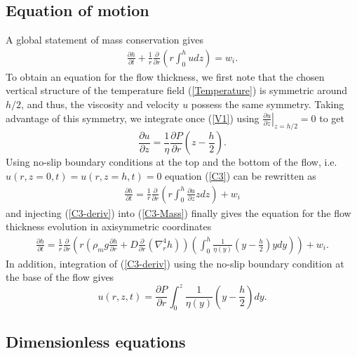 \subsection{Equation of motion}
\label{sec:equation-motion}

A global statement of mass conservation gives
\begin{eqnarray}
  \frac{\partial h}{\partial t}+ \frac{1}{r}
  \frac{\partial}{\partial
  r} \left( r\int_0^hudz\right)= w_i.
  \label{C3}
\end{eqnarray}
To obtain an  equation for the flow thickness, we  first note that the
chosen vertical structure of the temperature field (\ref{Temperature})
is symmetric  around $h/2$, and  thus, the viscosity and  velocity $u$
possess  the same  symmetry.   Taking advantage  of  this symmetry,  we
integrate              once              (\ref{V1})              using
$\left.\frac{\partial u}{\partial z}\right|_{z=h/2}=0$ to get
\begin{equation}
  \frac{\partial   u}{\partial   z}   =   \frac{1}{\eta}\frac{\partial
    P}{\partial r}\left(z-\frac{h}{2}\right).
  \label{C3-deriv}
\end{equation}
Using no-slip  boundary conditions at  the top  and the bottom  of the
flow,  i.e.  $u(r,z=0,t)=u(r,z=h,t)=0$  equation  (\ref{C3})  can  be
rewritten as
\begin{eqnarray}
  \frac{\partial h}{\partial t} = \frac{1}{r}
  \frac{\partial}{\partial
  r} \left( r\int_0^h\frac{\partial u}{\partial z}zdz\right) + w_i
  \label{C3-Mass}
\end{eqnarray}
and injecting (\ref{C3-deriv}) into  (\ref{C3-Mass}) finally gives the
equation for the flow thickness evolution in axisymmetric coordinates
\begin{eqnarray}
  \frac{\partial h}{\partial t} = \frac{1}{r}
  \frac{\partial}{\partial r} \left( r\left(\rho_m g \frac{\partial h}{\partial      r}+D\frac{\partial}{\partial      r}\left(\nabla_r^4h\right)\right)\left(\int_0^h\frac{1}{\eta(y)}\left(y-\frac{h}{2}\right)ydy\right)\right)
  + w_i.
  \label{C3-Mass-2}
\end{eqnarray}
In  addition,  integration  of   (\ref{C3-deriv})  using  the  no-slip
boundary condition at the base of the flow gives
\begin{equation}
  u(r,z,t) = \frac{\partial P}{\partial r} \int_0^z\frac{1}{\eta(y)}\left(y-\frac{h}{2}\right)dy.
\end{equation}

\subsection{Dimensionless equations}
\label{sec:dimens-equat}

